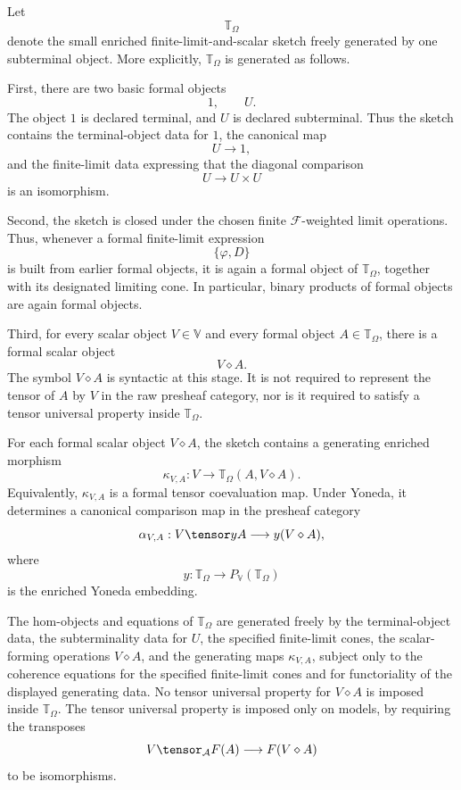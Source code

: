 Let
\[
    \mathbb T_{\Omega}
\]
denote the small enriched finite-limit-and-scalar sketch freely generated by one
subterminal object. More explicitly, \(\mathbb T_{\Omega}\) is generated as follows.

First, there are two basic formal objects
\[
    1,
    \qquad
    U.
\]
The object \(1\) is declared terminal, and \(U\) is declared subterminal. Thus the
sketch contains the terminal-object data for \(1\), the canonical map
\[
    U\longrightarrow 1,
\]
and the finite-limit data expressing that the diagonal comparison
\[
    U\longrightarrow U\times U
\]
is an isomorphism.

Second, the sketch is closed under the chosen finite \(\mathcal F\)-weighted limit
operations. Thus, whenever a formal finite-limit expression
\[
    \{\varphi,D\}
\]
is built from earlier formal objects, it is again a formal object of
\(\mathbb T_{\Omega}\), together with its designated limiting cone. In particular,
binary products of formal objects are again formal objects.

Third, for every scalar object \(V\in\mathbb V\) and every formal object
\(A\in\mathbb T_{\Omega}\), there is a formal scalar object
\[
    V\diamond A.
\]
The symbol \(V\diamond A\) is syntactic at this stage. It is not required to
represent the tensor of \(A\) by \(V\) in the raw presheaf category, nor is it
required to satisfy a tensor universal property inside \(\mathbb T_{\Omega}\).

For each formal scalar object \(V\diamond A\), the sketch contains a generating
enriched morphism
\[
    \kappa_{V,A}:
    V\longrightarrow
    \mathbb T_{\Omega}(A,V\diamond A).
\]
Equivalently, \(\kappa_{V,A}\) is a formal tensor coevaluation map. Under Yoneda,
it determines a canonical comparison map in the presheaf category
\[
    \alpha_{V,A}:
    V\tensor yA
    \longrightarrow
    y(V\diamond A),
\]
where
\[
    y:\mathbb T_{\Omega}\to
    P_{\mathbb V}(\mathbb T_{\Omega})
\]
is the enriched Yoneda embedding.

The hom-objects and equations of \(\mathbb T_{\Omega}\) are generated freely by the
terminal-object data, the subterminality data for \(U\), the specified finite-limit
cones, the scalar-forming operations \(V\diamond A\), and the generating maps
\(\kappa_{V,A}\), subject only to the coherence equations for the specified
finite-limit cones and for functoriality of the displayed generating data. No tensor
universal property for \(V\diamond A\) is imposed inside
\(\mathbb T_{\Omega}\). The tensor universal property is imposed only on models, by
requiring the transposes
\[
    V\tensor_{\mathcal A}F(A)\longrightarrow F(V\diamond A)
\]
to be isomorphisms.

